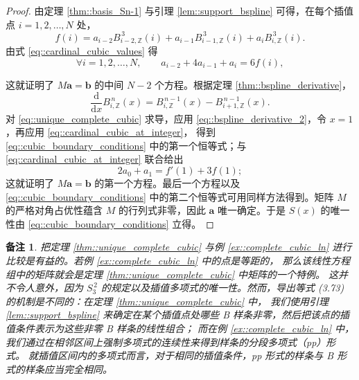 \documentclass[a4paper]{ctexart}
\newtheorem{remark}{备注}
\numberwithin{theorem}{section}
\numberwithin{equation}{section}
\numberwithin{figure}{section}
\numberwithin{remark}{section}
\begin{document}
\begin{proof}
由定理 \ref{thm::basis_Sn-1} 与引理 \ref{lem::support_bspline} 可得，在每个插值点 $i=1,2,\ldots,N$ 处，
\begin{equation*}
f(i)=a_{i-2}B^{\,3}_{i-2,\mathbb{Z}}(i)+a_{i-1}B^{\,3}_{i-1,\mathbb{Z}}(i)+a_iB^{\,3}_{i,\mathbb{Z}}(i).
\end{equation*}
由式 \eqref{eq::cardinal_cubic_values} 得
\begin{equation}
\label{eq::cardinal_cubic_at_integer}
\forall i=1,2,\ldots,N,\qquad a_{i-2}+4a_{i-1}+a_i=6f(i), 
\end{equation}

这就证明了 $M\mathbf{a}=\mathbf{b}$ 的中间 $N-2$ 个方程。根据定理 \ref{thm::bspline_derivative}，
\begin{equation}
\label{eq::bspline_derivative_2}    
\frac{\mathrm{d}}{\mathrm{d}x}B^{\,n}_{i,\mathbb{Z}}(x)
= B^{\,n-1}_{i,\mathbb{Z}}(x)-B^{\,n-1}_{i+1,\mathbb{Z}}(x). 
\end{equation}
对 \eqref{eq::unique_complete_cubic} 求导，应用 \eqref{eq::bspline_derivative_2}，令 $x=1$，再应用 \eqref{eq::cardinal_cubic_at_integer}，
得到 \eqref{eq::cubic_boundary_conditions} 中的第一个恒等式；与 \eqref{eq::cardinal_cubic_at_integer} 联合给出
\[
2a_0+a_1=f'(1)+3f(1);
\]
这就证明了 $M\mathbf{a}=\mathbf{b}$ 的第一个方程。最后一个方程以及 \eqref{eq::cubic_boundary_conditions} 
中的第二个恒等式可用同样方法得到。矩阵 $M$ 的严格对角占优性蕴含 $M$ 的行列式非零，因此 $\mathbf{a}$ 唯一确定。于是 $S(x)$ 的唯一性由 \eqref{eq::cubic_boundary_conditions} 立得。 
\end{proof}

\begin{remark}
    \label{rem::compare_357_38}
把定理 \ref{thm::unique_complete_cubic} 与例 \ref{ex::complete_cubic_ln} 进行比较是有益的。若例 \ref{ex::complete_cubic_ln} 中的点是等距的，
那么该线性方程组中的矩阵就会是定理 \ref{thm::unique_complete_cubic} 中矩阵的一个特例。
这并不令人意外，因为 $S^{\,2}_{3}$ 的规定以及插值多项式的唯一性。然而，导出等式 (3.73) 的机制是不同的：在定理 \ref{thm::unique_complete_cubic} 中，
我们使用引理 \ref{lem::support_bspline} 来确定在某个插值点处哪些 B 样条非零，然后把该点的插值条件表示为这些非零 B 样条的线性组合；
而在例 \ref{ex::complete_cubic_ln} 中，我们通过在相邻区间上强制多项式的连续性来得到样条的分段多项式（pp）形式。
就插值区间内的多项式而言，对于相同的插值条件，pp 形式的样条与 B 形式的样条应当完全相同。
\end{remark}
\end{document}
